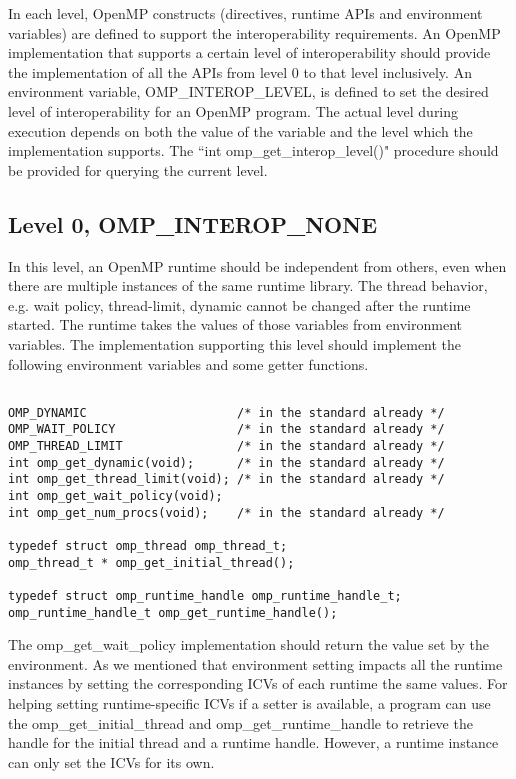 {In each level, 
OpenMP constructs (directives, runtime APIs and environment variables) are defined to support the interoperability 
requirements. 
An OpenMP implementation that supports a certain level of interoperability should provide the implementation of all the APIs
from level 0 to that level inclusively. 
An environment variable, {\sf OMP\_INTEROP\_LEVEL}, is defined to set the desired level of 
interoperability for an OpenMP program. The actual level during execution depends on both the value of 
the variable and the level which the implementation supports. 
The ``{\sf int omp\_get\_interop\_level()}" procedure should be provided for querying the current level. %

\subsection{Level 0, OMP\_INTEROP\_NONE}
In this level, an OpenMP runtime should be independent from others, even when there are multiple instances of the same runtime library. 
The thread behavior, e.g. wait policy, thread-limit, dynamic cannot be changed after the runtime started.
The runtime takes the values of those variables from environment variables. The implementation supporting 
this level should implement the following  
environment variables and some getter functions. 
\lstset{basicstyle=\sffamily\footnotesize,language=c, numbersep=1pt}
\begin{lstlisting}[frame=single]  % Start your code-block

OMP_DYNAMIC                     /* in the standard already */
OMP_WAIT_POLICY                 /* in the standard already */
OMP_THREAD_LIMIT                /* in the standard already */
int omp_get_dynamic(void);      /* in the standard already */
int omp_get_thread_limit(void); /* in the standard already */
int omp_get_wait_policy(void);
int omp_get_num_procs(void);    /* in the standard already */

typedef struct omp_thread omp_thread_t;
omp_thread_t * omp_get_initial_thread();

typedef struct omp_runtime_handle omp_runtime_handle_t;
omp_runtime_handle_t omp_get_runtime_handle();
\end{lstlisting}
The {\sf omp\_get\_wait\_policy} implementation should return the value set by the environment. 
As we mentioned that environment setting impacts all the runtime instances by setting the corresponding
ICVs of each runtime the same values. For helping setting runtime-specific ICVs if a setter is available, a program
can use the {\sf omp\_get\_initial\_thread} and {\sf  omp\_get\_runtime\_handle} to retrieve the handle for the
initial thread and a runtime handle. However, a runtime instance can only set the ICVs for its own. 

}

